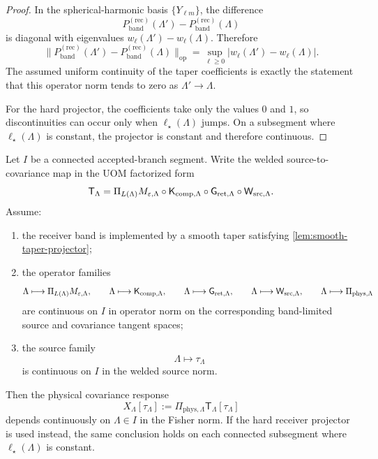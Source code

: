 \documentclass[11pt]{article}
\begin{document}
\begin{proof}
In the spherical-harmonic basis \(\{Y_{\ell m}\}\), the difference
\[
P^{\mathrm{(rec)}}_{\mathrm{band}}(\Lambda')
-
P^{\mathrm{(rec)}}_{\mathrm{band}}(\Lambda)
\]
is diagonal with eigenvalues \(w_\ell(\Lambda')-w_\ell(\Lambda)\).
Therefore
\[
\big\|
P^{\mathrm{(rec)}}_{\mathrm{band}}(\Lambda')
-
P^{\mathrm{(rec)}}_{\mathrm{band}}(\Lambda)
\big\|_{\mathrm{op}}
=
\sup_{\ell\ge 0}|w_\ell(\Lambda')-w_\ell(\Lambda)|.
\]
The assumed uniform continuity of the taper coefficients is exactly the statement that this operator
norm tends to zero as \(\Lambda'\to\Lambda\).

For the hard projector, the coefficients take only the values \(0\) and \(1\), so discontinuities can
occur only when \(\ell_\star(\Lambda)\) jumps.
On a subsegment where \(\ell_\star(\Lambda)\) is constant, the projector is constant and therefore
continuous.
\end{proof}

\begin{theorem}
\label{thm:smooth-taper-welded-response}
Let \(I\) be a connected accepted-branch segment.
Write the welded source-to-covariance map in the UOM factorized form
\begin{equation}
\mathsf T_\Lambda
=
\Pi_{L(\Lambda)}M_{\varepsilon,\Lambda}
\circ
\mathsf K_{{\rm comp},\Lambda}
\circ
\mathsf G_{{\rm ret},\Lambda}
\circ
\mathsf W_{{\rm src},\Lambda}.
\label{eq:factorized-welded-map}
\end{equation}
Assume:
\begin{enumerate}[leftmargin=2em]
\item the receiver band is implemented by a smooth taper satisfying
  \cref{lem:smooth-taper-projector};
\item the operator families
  \[
  \Lambda\longmapsto
  \Pi_{L(\Lambda)}M_{\varepsilon,\Lambda},\qquad
  \Lambda\longmapsto
  \mathsf K_{{\rm comp},\Lambda},\qquad
  \Lambda\longmapsto
  \mathsf G_{{\rm ret},\Lambda},\qquad
  \Lambda\longmapsto
  \mathsf W_{{\rm src},\Lambda},\qquad
  \Lambda\longmapsto
  \Pi_{\mathrm{phys},\Lambda}
  \]
  are continuous on \(I\) in operator norm on the corresponding band-limited source and covariance
  tangent spaces;
\item the source family
  \[
  \Lambda\longmapsto \tau_\Lambda
  \]
  is continuous on \(I\) in the welded source norm.
\end{enumerate}
Then the physical covariance response
\begin{equation}
X_\Lambda[\tau_\Lambda]
:=
\Pi_{\mathrm{phys},\Lambda}\mathsf T_\Lambda[\tau_\Lambda]
\label{eq:XLambda-tau-def}
\end{equation}
depends continuously on \(\Lambda\in I\) in the Fisher norm.
If the hard receiver projector is used instead, the same conclusion holds on each connected
subsegment where \(\ell_\star(\Lambda)\) is constant.
\end{theorem}
\end{document}
